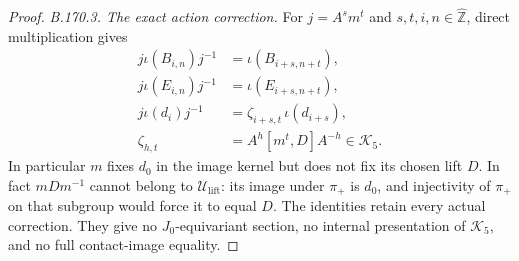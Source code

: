 \begin{proof}
\emph{B.170.3. The exact action correction.}
For \(j=A^sm^t\) and \(s,t,i,n\in\widehat{\mathbb Z}\), direct
multiplication gives
\begin{equation}\label{eq:B170-action-defect}
 \begin{aligned}
 j\iota(B_{i,n})j^{-1}&=\iota(B_{i+s,n+t}),\\
 j\iota(E_{i,n})j^{-1}&=\iota(E_{i+s,n+t}),\\
 j\iota(d_i)j^{-1}
   &=\zeta_{i+s,t}\,\iota(d_{i+s}),\\
 \zeta_{h,t}&=A^h[m^t,D]A^{-h}\in\mathcal K_5.
 \end{aligned}
\end{equation}
In particular \(m\) fixes \(d_0\) in the image kernel but does not fix
its chosen lift \(D\). In fact \(mDm^{-1}\) cannot belong to
\(\mathcal U_{\mathrm{lift}}\): its image under \(\pi_+\) is \(d_0\),
and injectivity of \(\pi_+\) on that subgroup would force it to equal \(D\).
The identities retain every actual correction. They give no
\(J_0\)-equivariant section, no internal presentation of
\(\mathcal K_5\), and no full contact-image equality.
\end{proof}
